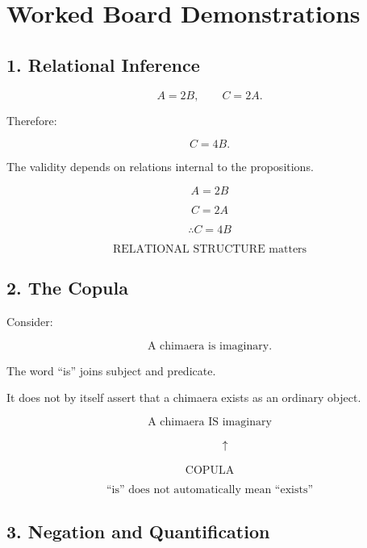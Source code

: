 \documentclass[11pt]{article}
\begin{document}
\section{Worked Board Demonstrations}

\subsection*{1. Relational Inference}

\[
A=2B,
\qquad
C=2A.
\]

Therefore:

\[
C=4B.
\]

The validity depends on relations internal to the propositions.

\begin{whiteboard}
\[
A=2B
\]

\[
C=2A
\]

\[
\therefore C=4B
\]

\[
\boxed{\text{RELATIONAL STRUCTURE matters}}
\]
\end{whiteboard}


\subsection*{2. The Copula}

Consider:

\[
\text{A chimaera is imaginary.}
\]

The word ``is'' joins subject and predicate.

It does not by itself assert that a chimaera exists as an ordinary
object.

\begin{whiteboard}
\[
\text{A chimaera IS imaginary}
\]

\[
\hspace{0.4in}\uparrow
\]

\[
\text{COPULA}
\]

\[
\boxed{\text{``is'' does not automatically mean ``exists''}}
\]
\end{whiteboard}


\subsection*{3. Negation and Quantification}
\end{document}
